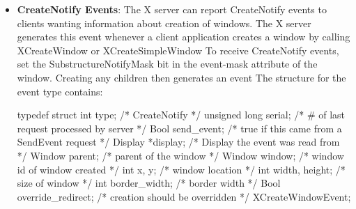\documentclass{report}
\begin{document}
\begin{itemize}
            The $x$ and $y$ members are set to the coordinates relative to the parent window’s origin and indicate the position of the upper-left outside corner of the window. The width and height members are set to the inside size of the window, not including the border. The border\_width member is set to the width of the window’s border, in pixels.
            \bigbreak \noindent 
            The above member is set to the sibling window and is used for stacking operations. If the X server sets this member to None, the window whose state was changed is on the bottom of the stack with respect to sibling windows. However, if this member is set to a sibling window, the window whose state was changed is placed on top of this sibling window.
            \bigbreak \noindent 
            The override\_redirect member is set to the override-redirect attribute of the window. Window manager clients normally should ignore this window if the override\_redirect member is True
        \item \textbf{CreateNotify Events}: The X server can report CreateNotify events to clients wanting information about creation of windows. The X server generates this event whenever a client application creates a window by calling XCreateWindow or XCreateSimpleWindow
            \bigbreak \noindent 
            To receive CreateNotify events, set the SubstructureNotifyMask bit in the event-mask attribute of the window. Creating any children then generates an event
            \bigbreak \noindent 
            The structure for the event type contains:
            \bigbreak \noindent 
            \begin{cppcode}
                typedef struct {
                    int type;                   /* CreateNotify */
                    unsigned long serial;       /* # of last request processed by server */
                    Bool send_event;            /* true if this came from a SendEvent request */
                    Display *display;           /* Display the event was read from */
                    Window parent;              /* parent of the window */
                    Window window;              /* window id of window created */
                    int x, y;                   /* window location */
                    int width, height;          /* size of window */
                    int border_width;           /* border width */
                    Bool override_redirect;     /* creation should be overridden */
                } XCreateWindowEvent;
            \end{cppcode}

\end{itemize}
\end{document}
